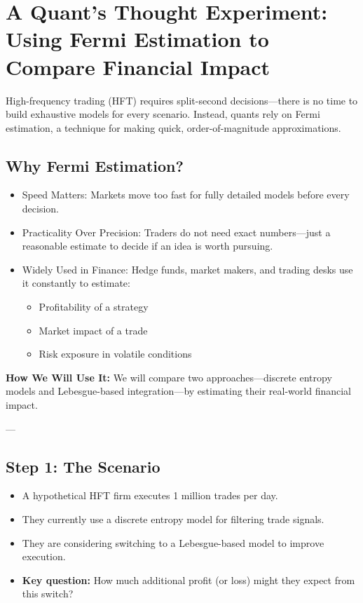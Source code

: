 \section{A Quant's Thought Experiment: Using Fermi Estimation to Compare Financial Impact}

High-frequency trading (HFT) requires split-second decisions—there is no time to build exhaustive models for every scenario. Instead, quants rely on Fermi estimation, a technique for making quick, order-of-magnitude approximations.

\subsection{Why Fermi Estimation?}

\begin{itemize}
    \item Speed Matters: Markets move too fast for fully detailed models before every decision.
    \item Practicality Over Precision: Traders do not need exact numbers—just a reasonable estimate to decide if an idea is worth pursuing.
    \item Widely Used in Finance: Hedge funds, market makers, and trading desks use it constantly to estimate:
        \begin{itemize}
            \item Profitability of a strategy
            \item Market impact of a trade
            \item Risk exposure in volatile conditions
        \end{itemize}
\end{itemize}

\textbf{How We Will Use It:} We will compare two approaches—discrete entropy models and Lebesgue-based integration—by estimating their real-world financial impact.

---

\subsection{Step 1: The Scenario}

\begin{itemize}
    \item A hypothetical HFT firm executes 1 million trades per day.
    \item They currently use a discrete entropy model for filtering trade signals.
    \item They are considering switching to a Lebesgue-based model to improve execution.
    \item \textbf{Key question:} How much additional profit (or loss) might they expect from this switch?
\end{itemize}

